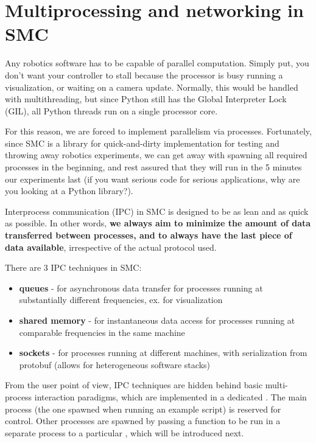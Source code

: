 \section{Multiprocessing and networking in SMC}
Any robotics software has to be capable of parallel computation.
Simply put, you don't want your controller to stall because the processor
is busy running a visualization, or waiting on a camera update.
Normally, this would be handled with multithreading,
but since Python still has the Global Interpreter Lock (GIL),
all Python threads run on a single processor core.

For this reason, we are forced to implement parallelism via processes.
Fortunately, since SMC is a library for quick-and-dirty implementation
for testing and throwing away robotics experiments, we can get away with
spawning all required processes in the beginning, and rest assured
that they will run in the 5 minutes our experiments last
(if you want serious code for serious applications, why are you looking at a Python library?).

Interprocess communication (IPC) in SMC is designed to be as lean and as quick as possible.
In other words, \textbf{we always aim to minimize the amount of data transferred
between processes, and to always have the last piece of data available},
irrespective of the actual protocol used.

There are 3 IPC techniques in SMC: 
\begin{itemize}
\item \textbf{queues} - for asynchronous data transfer for processes
		running at substantially different frequencies,
		ex. for visualization
\item \textbf{shared memory} - for instantaneous data access
		for processes running at comparable frequencies in the same machine
\item \textbf{sockets} - for processes running at different machines,
		with serialization from protobuf (allows for heterogeneous software stacks)
\end{itemize}

From the user point of view, IPC techniques are hidden
behind basic multi-process interaction paradigms, which
are implemented in a dedicated .
The main process (the one spawned when running an example script) is reserved
for control. Other processes are spawned by passing a function
to be run in a separate process
to a particular , which will be introduced next.

